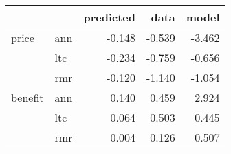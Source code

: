 \begin{tabular}{llrrr}
\toprule
        &     &  predicted &   data &  model \\
\midrule
price & ann &     -0.148 & -0.539 & -3.462 \\
        & ltc &     -0.234 & -0.759 & -0.656 \\
        & rmr &     -0.120 & -1.140 & -1.054 \\
benefit & ann &      0.140 &  0.459 &  2.924 \\
        & ltc &      0.064 &  0.503 &  0.445 \\
        & rmr &      0.004 &  0.126 &  0.507 \\
\bottomrule
\end{tabular}
